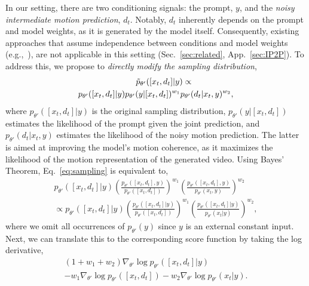 In our setting, there are two conditioning signals: the prompt, $y$, and the \emph{noisy intermediate motion prediction}, $d_t$. Notably, $d_t$ inherently depends on the prompt and model weights, as it is generated by the model itself. Consequently, existing approaches that assume independence between conditions and model weights (e.g.,~\citet{brooks2022instructpix2pix}), are not applicable in this setting (Sec.~\ref{sec:related}, App.~\ref{sec:IP2P}). To address this, we propose to \emph{directly modify the sampling distribution},
\begin{equation}
 \begin{aligned}   
     \Tilde{p}_{\theta'}([x_t, d_t] | y) \propto \quad\quad\quad \quad\quad \\ {p}_{\theta'}([x_t, d_t] | y) {p}_{\theta'}(y | [x_t, d_t])^{w_1} {p}_{\theta'}(d_t | x_t, y)^{w_2} ,
     \label{eq:sampling}
\end{aligned}
\end{equation}
where ${p}_{\theta'}([x_t, d_t] | y)$ is the original sampling distribution, ${p}_{\theta'}(y | [x_t, d_t])$ estimates the likelihood of the prompt given the joint prediction, and ${p}_{\theta'}(d_t | x_t, y)$ estimates the likelihood of the noisy motion prediction. The latter is aimed at improving the model's motion coherence, as it maximizes the likelihood of the motion representation of the generated video.
Using Bayes' Theorem, Eq.~\ref{eq:sampling} is equivalent to, 
\begin{align*}
     {p}_{\theta'}\left([x_t, d_t] | y\right)\left(\frac{{p}_{\theta'}([x_t, d_t], y)}{{p}_{\theta'}( [x_t, d_t])}\right)^{w_1}\left(\frac{{p}_{\theta'}([x_t, d_t], y)}{{p}_{\theta'} (x_t, y)}\right)^{w_2}\quad \\
     \propto {p}_{\theta'}([x_t, d_t] | y)\left(\frac{{p}_{\theta'}([x_t, d_t] | y)}{{p}_{\theta'}( [x_t, d_t])}\right)^{w_1}\left(\frac{{p}_{\theta'}([x_t, d_t] | y)}{{p}_{\theta'} (x_t | y)}\right)^{w_2},
\end{align*}
where we omit all occurrences of ${p}_{\theta'} (y)$ since $y$ is an external constant input. Next, we can translate this to the corresponding score function by taking the log derivative,
\begin{equation}
 \begin{aligned}    (1+w_1+w_2)\nabla_{\theta'}\log{{p}_{\theta'}([x_t, d_t] | y)} \quad \quad\\
     -w_1\nabla_{\theta'}\log{{p}_{\theta'}([x_t, d_t])} - w_2 \nabla_{\theta'}\log{{p}_{\theta'}(x_t |y)}.
     \label{eq:guidance}
\end{aligned}
\end{equation}

